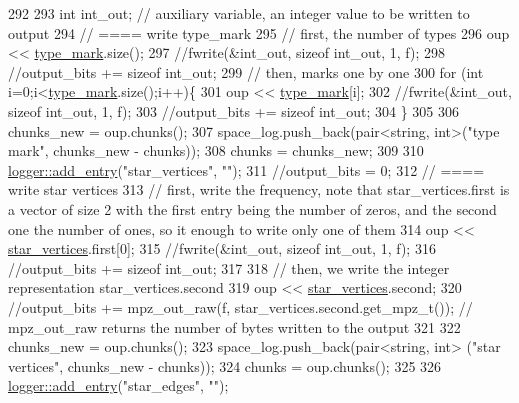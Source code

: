 \begin{DoxyCode}
292 
293   \textcolor{keywordtype}{int} int\_out; \textcolor{comment}{// auxiliary variable, an integer value to be written to output}
294   \textcolor{comment}{// ==== write type\_mark}
295   \textcolor{comment}{// first, the number of types}
296   oup <<  \hyperlink{classmarked__graph__compressed_a86b00223525703e973415cbc9c94da68}{type\_mark}.size();
297   \textcolor{comment}{//fwrite(&int\_out, sizeof int\_out, 1, f);}
298   \textcolor{comment}{//output\_bits += sizeof int\_out;}
299   \textcolor{comment}{// then, marks one by one}
300   \textcolor{keywordflow}{for} (\textcolor{keywordtype}{int} i=0;i<\hyperlink{classmarked__graph__compressed_a86b00223525703e973415cbc9c94da68}{type\_mark}.size();i++)\{
301     oup <<  \hyperlink{classmarked__graph__compressed_a86b00223525703e973415cbc9c94da68}{type\_mark}[i];
302     \textcolor{comment}{//fwrite(&int\_out, sizeof int\_out, 1, f);}
303     \textcolor{comment}{//output\_bits += sizeof int\_out;}
304   \}
305 
306   chunks\_new = oup.chunks();
307   space\_log.push\_back(pair<string, int>(\textcolor{stringliteral}{"type mark"}, chunks\_new - chunks));
308   chunks = chunks\_new;
309 
310   \hyperlink{classlogger_a710163deb17bc81f70d53d285b8ac9ac}{logger::add\_entry}(\textcolor{stringliteral}{"star\_vertices"}, \textcolor{stringliteral}{""});
311   \textcolor{comment}{//output\_bits = 0;}
312   \textcolor{comment}{// ==== write star vertices}
313   \textcolor{comment}{// first, write the frequency, note that star\_vertices.first is a vector of size 2 with the first entry
       being the number of zeros, and the second one the number of ones, so it enough to write only one of them}
314   oup << \hyperlink{classmarked__graph__compressed_a7a4ced4586e2e353f9076bd447df5208}{star\_vertices}.first[0];
315   \textcolor{comment}{//fwrite(&int\_out, sizeof int\_out, 1, f);}
316   \textcolor{comment}{//output\_bits += sizeof int\_out;}
317 
318   \textcolor{comment}{// then, we write the integer representation star\_vertices.second}
319   oup << \hyperlink{classmarked__graph__compressed_a7a4ced4586e2e353f9076bd447df5208}{star\_vertices}.second;
320   \textcolor{comment}{//output\_bits +=  mpz\_out\_raw(f, star\_vertices.second.get\_mpz\_t()); // mpz\_out\_raw returns the number of
       bytes written to the output}
321 
322   chunks\_new = oup.chunks();
323   space\_log.push\_back(pair<string, int> (\textcolor{stringliteral}{"star vertices"}, chunks\_new - chunks));
324   chunks = oup.chunks();
325 
326   \hyperlink{classlogger_a710163deb17bc81f70d53d285b8ac9ac}{logger::add\_entry}(\textcolor{stringliteral}{"star\_edges"}, \textcolor{stringliteral}{""});

\end{DoxyCode}
